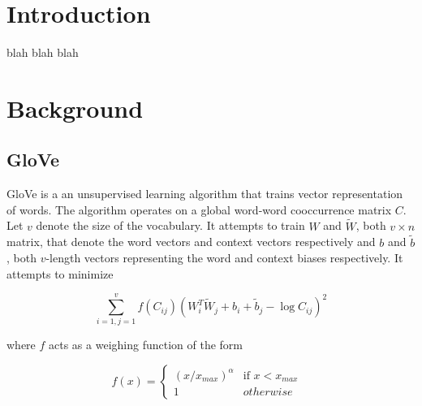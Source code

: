 \documentclass[letterpaper]{article}
\title{\thetitle}
\begin{document}
\maketitle
\begin{abstract}
Embeddings of natural-language words in a vector space are useful for a variety
of tasks in semantics. Embeddings learned from unstructured text can be
combined with structured knowledge to achieve performance that neither source
would achieve on its own, as shown by .
In this paper, we show the effectiveness
of combining the GloVe embeddings \cite{pennington2014glove} with the
crowd-sourced semantic network ConceptNet \cite{speer2012conceptnet}, with
some changes to the GloVe embeddings and the ``retrofitting'' algorithm.
The resulting vector space has a larger vocabulary
than either source, and achieves state-of-the-art performance on multiple word
similarity evaluations, including an unprecedented score of $\rho = \scoreRW{}$
on an evaluation of rare words.
\end{abstract}

\section{Introduction}
blah blah blah

\section{Background}

\subsection{GloVe}

GloVe \cite{pennington2014glove} is a an unsupervised learning algorithm that
trains vector representation of words. The algorithm operates on a global
word-word cooccurrence matrix $C$. Let $v$ denote the size of the vocabulary.
It attempts to train $W$ and $\tilde{W}$, both $v \times n$ matrix, that
denote the word vectors and context vectors respectively and $b$ and
$\tilde{b}$, both $v$-length vectors representing the word and context biases
respectively. It attempts to minimize

$$
\sum_{i=1,j=1}^v
  f \left( C_{ij} \right)
  \left( W_i^T \tilde{W}_j + b_i + \tilde{b}_j - \log{C_{ij}} \right)^2
$$

where $f$ acts as a weighing function of the form

$$
f \left( x \right) =
  \begin{cases}
    \left( x / x_{max} \right)^\alpha & \text{if $x < x_{max}$ } \\
    1 & otherwise
  \end{cases}
$$
\end{document}
